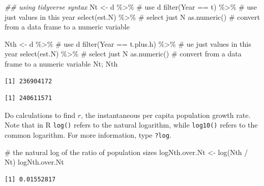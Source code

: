 \documentclass[
  letterpaper,
  DIV=11,
  numbers=noendperiod]{scrreprt}
\newenvironment{Shaded}{\begin{snugshade}}{\end{snugshade}}
\newcommand{\CommentTok}[1]{\textcolor[rgb]{0.37,0.37,0.37}{#1}}
\newcommand{\DocumentationTok}[1]{\textcolor[rgb]{0.37,0.37,0.37}{\textit{#1}}}
\newcommand{\FunctionTok}[1]{\textcolor[rgb]{0.28,0.35,0.67}{#1}}
\newcommand{\NormalTok}[1]{\textcolor[rgb]{0.00,0.23,0.31}{#1}}
\newcommand{\OtherTok}[1]{\textcolor[rgb]{0.00,0.23,0.31}{#1}}
\newcommand{\SpecialCharTok}[1]{\textcolor[rgb]{0.37,0.37,0.37}{#1}}
\begin{document}
\begin{Shaded}
\begin{Highlighting}[]
\DocumentationTok{\#\# using tidyverse syntax}
\NormalTok{Nt }\OtherTok{\textless{}{-}}\NormalTok{  d }\SpecialCharTok{\%\textgreater{}\%} \CommentTok{\# use d}
  \FunctionTok{filter}\NormalTok{(Year }\SpecialCharTok{==}\NormalTok{ t) }\SpecialCharTok{\%\textgreater{}\%}  \CommentTok{\# use just values in this year}
   \FunctionTok{select}\NormalTok{(est.N) }\SpecialCharTok{\%\textgreater{}\%} \CommentTok{\# select just N}
  \FunctionTok{as.numeric}\NormalTok{() }\CommentTok{\# convert from a data frame to a numeric variable}

\NormalTok{Nth }\OtherTok{\textless{}{-}}\NormalTok{  d }\SpecialCharTok{\%\textgreater{}\%} \CommentTok{\# use d}
  \FunctionTok{filter}\NormalTok{(Year }\SpecialCharTok{==}\NormalTok{ t.plus.h) }\SpecialCharTok{\%\textgreater{}\%}  \CommentTok{\# ue just values in this year}
   \FunctionTok{select}\NormalTok{(est.N) }\SpecialCharTok{\%\textgreater{}\%} \CommentTok{\# select just N}
  \FunctionTok{as.numeric}\NormalTok{() }\CommentTok{\# convert from a data frame to a numeric variable}
\NormalTok{Nt; Nth}
\end{Highlighting}
\end{Shaded}

\begin{verbatim}
[1] 236904172
\end{verbatim}

\begin{verbatim}
[1] 240611571
\end{verbatim}

Do calculations to find \(r\), the instantaneous per capita population
growth rate. Note that in R \texttt{log()} refers to the natural
logarithm, while \texttt{log10()} refers to the common logarithm. For
more information, type \texttt{?log}.

\begin{Shaded}
\begin{Highlighting}[]
\CommentTok{\# the natural log of the ratio of population sizes}
\NormalTok{logNth.over.Nt }\OtherTok{\textless{}{-}} \FunctionTok{log}\NormalTok{(Nth }\SpecialCharTok{/}\NormalTok{ Nt)}
\NormalTok{logNth.over.Nt}
\end{Highlighting}
\end{Shaded}

\begin{verbatim}
[1] 0.01552817
\end{verbatim}
\end{document}
